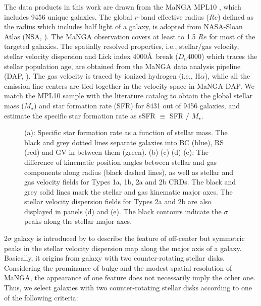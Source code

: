 \documentclass{aastex631}
\begin{document}
The data products in this work are drawn from the MaNGA MPL10 \citep{2017AJ....154...86W, 2016AJ....151....8Y, 2016AJ....152..197Y}, which includes 9456 unique galaxies. The global $r$-band effective radius ($Re$) defined as the radius which includes half light of a galaxy, is adopted from NASA-Sloan Atlas (NSA, \citealt{2011AJ....142...31B}). The MaNGA observation covers at least to 1.5 $Re$ for most of the targeted galaxies. The spatially resolved properties, i.e., stellar/gas velocity, stellar velocity dispersion and Lick index 4000\AA\ break ($D_{n}4000$) which traces the stellar population age, are obtained from the MaNGA data analysis pipeline (DAP, \citealt{2019AJ....158..231W}). The gas velocity is traced by ionized hydrogen (i.e., H$\alpha$), while all the emission line centers are tied together in the velocity space in MaNGA DAP. We match the MPL10 sample with the literature catalog \citep{2015ApJS..219....8C} to obtain the global stellar mass ($M_{\star}$) and star formation rate (SFR) for 8431 out of 9456 galaxies, and estimate the specific star formation rate as sSFR $\equiv$ SFR / $M_{\star}$.

\begin{figure}[ht!]
    \caption{(a): Specific star formation rate as a function of stellar mass. The black and grey dotted lines separate galaxies into BC (blue), RS (red) and GV in-between them (green). (b) (c) (d) (e): The difference of kinematic position angles between stellar and gas components along radius (black dashed lines), as well as stellar and gas velocity fields for Types 1a, 1b, 2a and 2b CRDs. The black and grey solid lines mark the stellar and gas kinematic major axes. The stellar velocity dispersion fields for Types 2a and 2b are also displayed in panels (d) and (e). The black contours indicate the $\sigma$ peaks along the stellar major axes. \label{fig1}}
    \end{figure}

2$\sigma$ galaxy is introduced by \cite{2011MNRAS.416.1680C} to describe the feature of off-center but symmetric peaks in the stellar velocity dispersion map along the major axis of a galaxy. Basically, it origins from galaxy with two counter-rotating stellar disks. Considering the prominance of bulge and the modest spatial resolution of MaNGA, the appearance of one feature does not necessarily imply the other one. Thus, we select galaxies with two counter-rotating stellar disks according to one of the following criteria:
\end{document}
